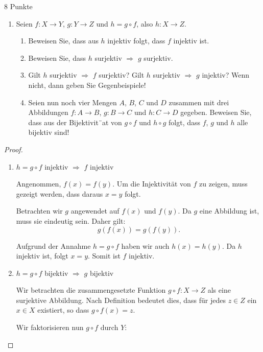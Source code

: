 \documentclass{../problemset}
\begin{document}
\pagebreak

\begin{problem}{8 Punkte}
\begin{enumerate}
	\item Seien $f: X \to Y$, $g: Y \to Z$ und $h = g \circ f$, also $h: X \to Z$.
	      \begin{enumerate}
		      \item Beweisen Sie, dass aus $h$ injektiv folgt, dass $f$ injektiv ist.
		      \item Beweisen Sie, dass $h$ surjektiv $\Rightarrow$ $g$ surjektiv.
		      \item Gilt $h$ surjektiv $\Rightarrow$ $f$ surjektiv? Gilt $h$ surjektiv $\Rightarrow$ $g$ injektiv? Wenn nicht, dann geben Sie Gegenbeispiele!
		      \item Seien nun noch vier Mengen $A$, $B$, $C$ und $D$ zusammen mit drei Abbildungen $f: A \to B$, $g: B \to C$ und $h: C \to D$ gegeben. Beweisen Sie, dass aus der Bijektivit¨at von $g \circ f$ und $h \circ g$ folgt, dass $f$, $g$ und $h$ alle bijektiv sind!
	      \end{enumerate}

\end{enumerate}

\begin{proof} $ $
	\begin{enumerate}
		\item $h = g \circ f$ injektiv $\Rightarrow$ $f$ injektiv

		      Angenommen, $f(x) = f(y)$. Um die Injektivität von $f$ zu zeigen, muss gezeigt werden, dass daraus $x = y$ folgt.

		      Betrachten wir $g$ angewendet auf $f(x)$ und $f(y)$. Da $g$ eine Abbildung ist, muss sie eindeutig sein. Daher gilt:
		      \[
			      g(f(x)) = g(f(y)).
		      \]

		      Aufgrund der Annahme $h = g \circ f$ haben wir auch $h(x) = h(y)$.
		      Da $h$ injektiv ist, folgt $x = y$. Somit ist $f$ injektiv. \checkmark
		\item $h = g \circ f$ bijektiv $\Rightarrow$ $g$ bijektiv

		      Wir betrachten die zusammengesetzte Funktion \(g \circ f: X \to Z\) als eine surjektive Abbildung. Nach Definition bedeutet dies, dass für jedes \(z \in Z\) ein \(x \in X\) existiert, so dass \(g \circ f(x) = z\).

		      Wir faktorisieren nun \(g \circ f\) durch \(Y\):


\end{enumerate}
\end{proof}
\end{problem}
\end{document}
